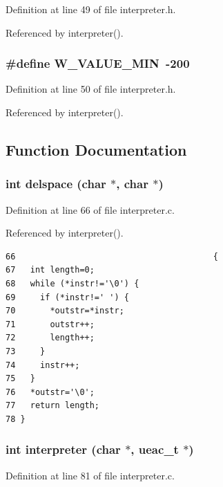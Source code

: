 Definition at line 49 of file interpreter.h.

Referenced by interpreter().
\subsubsection{\setlength{\rightskip}{0pt plus 5cm}\#define W\_\-VALUE\_\-MIN~-200}\label{interpreter_8h_a1}




Definition at line 50 of file interpreter.h.

Referenced by interpreter().

\subsection{Function Documentation}
\subsubsection{\setlength{\rightskip}{0pt plus 5cm}int delspace (char $\ast$, char $\ast$)}\label{interpreter_8h_a3}




Definition at line 66 of file interpreter.c.

Referenced by interpreter().

\footnotesize\begin{verbatim}66                                        {
67   int length=0;
68   while (*instr!='\0') {
69     if (*instr!=' ') {
70       *outstr=*instr;
71       outstr++;
72       length++;
73     }
74     instr++;
75   }
76   *outstr='\0';
77   return length;
78 }
\end{verbatim}\normalsize 


\subsubsection{\setlength{\rightskip}{0pt plus 5cm}int interpreter (char $\ast$, {\bf ueac\_\-t} $\ast$)}\label{interpreter_8h_a2}




Definition at line 81 of file interpreter.c.

